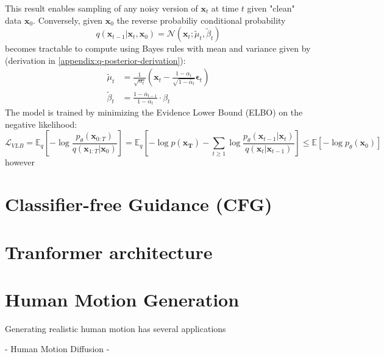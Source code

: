 This result enables sampling of any noisy version of $\mathbf{x}_t$ at time $t$ given "clean" data $\mathbf{x}_0$. Conversely, given $\mathbf{x}_0$ the reverse probabiliy conditional probability 
\begin{equation*}
    q(\mathbf{x}_{t-1} \vert \mathbf{x}_t, \mathbf{x}_0) = \mathcal{N}\left( \mathbf{x}_t; \tilde{\mu}_t, \tilde{\beta}_t \right)
\end{equation*}
becomes tractable to compute using Bayes rules with mean and variance given by (derivation in \cref{appendix:q-posterior-derivation}):
\begin{align}
    \tilde{\mu}_t &= \frac{1}{\sqrt{\alpha_t}}\left(\mathbf{x}_t-\frac{1-\alpha_t}{\sqrt{1-\bar{\alpha}_t}} \mathbf{\epsilon}_t\right) \\
    \tilde{\beta}_t &= \frac{1-\bar{\alpha}_{t-1}}{1-\bar{\alpha}_t} \cdot \beta_t
\end{align}
The model is trained by minimizing the Evidence Lower Bound (ELBO) on the negative likelihood:
\begin{equation}
    \mathcal{L}_{VLB}
        = \mathbb{E}_q\left[ - \log \frac{p_\theta(\mathbf{x}_{0:T})}{q(\mathbf{x}_{1:T} \vert \mathbf{x}_0)}\right]
        = \mathbb{E}_q\left[- \log p(\mathbf{x_T}) - \sum_{t \geq 1} \log \frac{p_\theta(\mathbf{x}_{t-1} \vert \mathbf{x}_{t})}{q(\mathbf{x}_t \vert \mathbf{x}_{t-1})}
        \right]
        \leq \mathbb{E}\left[- \log p_\theta(\mathbf{x}_0)\right]
\end{equation}
however 

\section{Classifier-free Guidance (CFG)}


\section{Tranformer architecture}

\section{Human Motion Generation}
Generating realistic human motion has several applications 


- Human Motion Diffusion
- 


